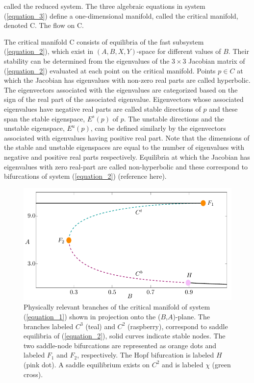 \documentclass{ws-ijbc}
\begin{document}
\noindent
called the reduced system. The three algebraic equations in system (\ref{equation_3}) define a one-dimensional manifold, called the critical manifold, denoted C.  The flow on C.  

The critical manifold C consists of equilibria of the fast subsystem (\ref{equation_2}), which exist in $(A,B,X,Y)$-space for different values of $B$.  Their stability can be determined from the eigenvalues of the $3\times3$ Jacobian matrix of (\ref{equation_2}) evaluated at each point on the critical manifold.  Points $p \in C$ at which the Jacobian has eigenvalues with non-zero real parts are called hyperbolic.  The eigenvectors associated with the eigenvalues are categorized based on the sign of the real part of the associated eigenvalue.  Eigenvectors whose associated eigenvalues have negative real parts are called stable directions of $p$ and these span the stable eigenspace, $E^{s}(p)$ of $p$.  The unstable directions and the unstable eigenspace, $E^{u}(p)$, can be defined similarly by the eigenvectors associated with eigenvalues having positive real part.  Note that the dimensions of the stable and unstable eigenspaces are equal to the number of eigenvalues with negative and positive real parts respectively.  Equilibria at which the Jacobian has eigenvalues with zero real-part are called non-hyperbolic and these correspond to bifurcations of system (\ref{equation_2}) (reference here).

\begin{figure}[!t]
\begin{center}
\includegraphics[page=1]{figures.pdf}
\end{center}
\caption{Physically relevant branches of the critical manifold of system (\ref{equation_1}) shown in projection onto the ($B$,$A$)-plane.  The branches labeled $C^3$ (teal) and $C^2$ (raspberry), correspond to saddle equilibria of (\ref{equation_2}), solid curves indicate stable nodes.  The two saddle-node bifurcations are represented as orange dots and labeled $F_1$ and $F_2$, respectively.  The Hopf bifurcation is labeled $H$ (pink dot).  A saddle equilibrium exists on $C^2$ and is labeled $\chi$ (green cross).}
\label{critical_figure}
\end{figure}
\end{document}
